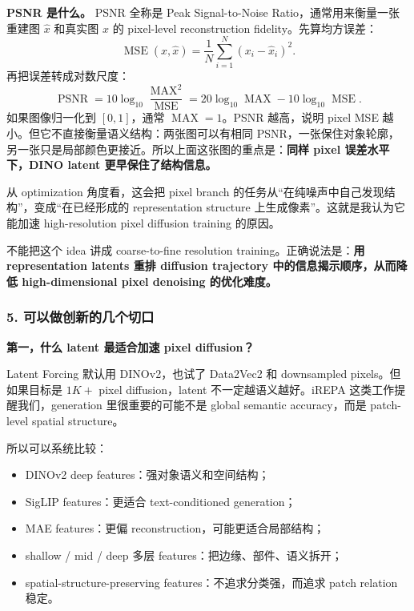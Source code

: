 \begin{intubox}
\textbf{PSNR 是什么。} PSNR 全称是 Peak Signal-to-Noise Ratio，通常用来衡量一张重建图 $\hat{x}$ 和真实图 $x$ 的 pixel-level reconstruction fidelity。先算均方误差：
\[
\operatorname{MSE}(x,\hat{x})
=
\frac{1}{N}\sum_{i=1}^{N}(x_i-\hat{x}_i)^2 .
\]
再把误差转成对数尺度：
\[
\operatorname{PSNR}
=
10\log_{10}\frac{\operatorname{MAX}^2}{\operatorname{MSE}}
=
20\log_{10}\operatorname{MAX}-10\log_{10}\operatorname{MSE}.
\]
如果图像归一化到 $[0,1]$，通常 $\operatorname{MAX}=1$。PSNR 越高，说明 pixel MSE 越小。但它不直接衡量语义结构：两张图可以有相同 PSNR，一张保住对象轮廓，另一张只是局部颜色更接近。所以上面这张图的重点是：\textbf{同样 pixel 误差水平下，DINO latent 更早保住了结构信息。}
\end{intubox}

从 optimization 角度看，这会把 pixel branch 的任务从“在纯噪声中自己发现结构”，变成“在已经形成的 representation structure 上生成像素”。这就是我认为它能加速 high-resolution pixel diffusion training 的原因。

\begin{warnbox}
不能把这个 idea 讲成 coarse-to-fine resolution training。正确说法是：\textbf{用 representation latents 重排 diffusion trajectory 中的信息揭示顺序，从而降低 high-dimensional pixel denoising 的优化难度。}
\end{warnbox}

\subsubsection*{5. 可以做创新的几个切口}

\textbf{第一，什么 latent 最适合加速 pixel diffusion？}

Latent Forcing 默认用 DINOv2，也试了 Data2Vec2 和 downsampled pixels。但如果目标是 $1K+$ pixel diffusion，latent 不一定越语义越好。iREPA 这类工作提醒我们，generation 里很重要的可能不是 global semantic accuracy，而是 patch-level spatial structure。

所以可以系统比较：
\begin{itemize}[leftmargin=1.5em]
  \item DINOv2 deep features：强对象语义和空间结构；
  \item SigLIP features：更适合 text-conditioned generation；
  \item MAE features：更偏 reconstruction，可能更适合局部结构；
  \item shallow / mid / deep 多层 features：把边缘、部件、语义拆开；
  \item spatial-structure-preserving features：不追求分类强，而追求 patch relation 稳定。
\end{itemize}

